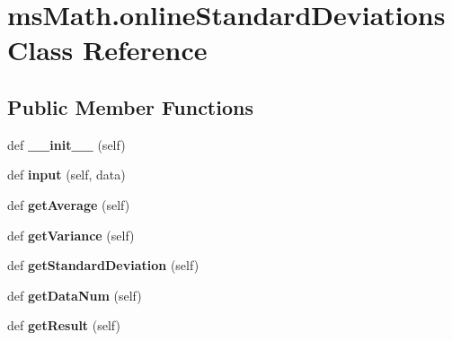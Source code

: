\hypertarget{classmsMath_1_1onlineStandardDeviations}{}\section{ms\+Math.\+online\+Standard\+Deviations Class Reference}
\label{classmsMath_1_1onlineStandardDeviations}
\subsection*{Public Member Functions}
\begin{DoxyCompactItemize}
\item 
def {\bfseries \+\_\+\+\_\+init\+\_\+\+\_\+} (self)\hypertarget{classmsMath_1_1onlineStandardDeviations_aefffd5741b605cea400ef347f7710142}{}\label{classmsMath_1_1onlineStandardDeviations_aefffd5741b605cea400ef347f7710142}

\item 
def {\bfseries input} (self, data)\hypertarget{classmsMath_1_1onlineStandardDeviations_a45b2579ea416b3b7f01d7c675bea291f}{}\label{classmsMath_1_1onlineStandardDeviations_a45b2579ea416b3b7f01d7c675bea291f}

\item 
def {\bfseries get\+Average} (self)\hypertarget{classmsMath_1_1onlineStandardDeviations_a60b2e5b01196a83f22fa952a81cedac1}{}\label{classmsMath_1_1onlineStandardDeviations_a60b2e5b01196a83f22fa952a81cedac1}

\item 
def {\bfseries get\+Variance} (self)\hypertarget{classmsMath_1_1onlineStandardDeviations_ac725aac7593b0eb31bb109c7fdfc86fc}{}\label{classmsMath_1_1onlineStandardDeviations_ac725aac7593b0eb31bb109c7fdfc86fc}

\item 
def {\bfseries get\+Standard\+Deviation} (self)\hypertarget{classmsMath_1_1onlineStandardDeviations_a67025340b07659590de7e309bc5e1320}{}\label{classmsMath_1_1onlineStandardDeviations_a67025340b07659590de7e309bc5e1320}

\item 
def {\bfseries get\+Data\+Num} (self)\hypertarget{classmsMath_1_1onlineStandardDeviations_a419ce39e6c7af2b2b612371e05ed3d9f}{}\label{classmsMath_1_1onlineStandardDeviations_a419ce39e6c7af2b2b612371e05ed3d9f}

\item 
def {\bfseries get\+Result} (self)\hypertarget{classmsMath_1_1onlineStandardDeviations_aa2cd46633ff8694408ed62a03c526576}{}\label{classmsMath_1_1onlineStandardDeviations_aa2cd46633ff8694408ed62a03c526576}

\end{DoxyCompactItemize}
